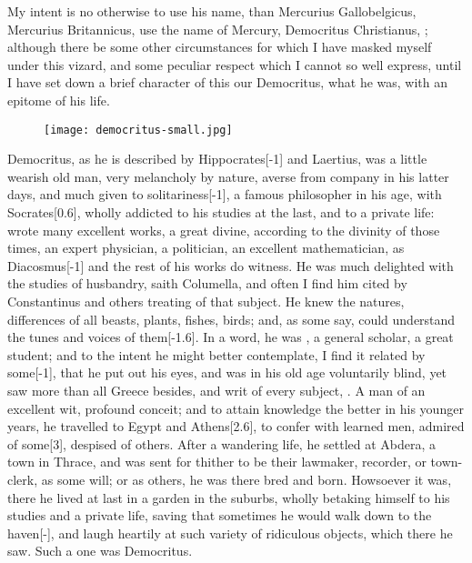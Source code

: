 {My intent is no otherwise to use his name, than Mercurius
Gallobelgicus, Mercurius Britannicus, use the name of Mercury,
Democritus Christianus, \etc; although there be some other
circumstances for which I have masked myself under this vizard, and
some peculiar respect which I cannot so well express, until I have set
down a brief character of this our Democritus, what he was, with an
epitome of his life.
\begin{figure}[H]
  \begingroup
  \centering
  \texttt{[image: democritus-small.jpg]}
  \label{fig:democritus}
\end{figure}
Democritus, as he is described by Hippocrates[-1\baselineskip] and Laertius, was
a little wearish old man, very melancholy by nature, averse from
company in his latter days, and much given to solitariness[-1\baselineskip], a
famous philosopher in his age,  with Socrates[0.6\baselineskip], wholly
addicted to his studies at the last, and to a private life: wrote many
excellent works, a great divine, according to the divinity of those
times, an expert physician, a politician, an excellent mathematician,
as Diacosmus[-1\baselineskip] and the rest of his works do witness. He was much
delighted with the studies of husbandry, saith Columella, and often
I find him cited by Constantinus and others treating of that
subject. He knew the natures, differences of all beasts, plants,
fishes, birds; and, as some say, could understand the tunes and
voices of them[-1.6\baselineskip]. In a word, he was , a general scholar,
a great student; and to the intent he might better contemplate, I
find it related by some[-1\baselineskip], that he put out his eyes, and was in his old
age voluntarily blind, yet saw more than all Greece besides, and 
writ of every subject, . A man of an excellent wit, profound conceit; and to
attain knowledge the better in his younger years, he travelled to Egypt
and Athens[2.6\baselineskip], to confer with learned men, admired of some[3\baselineskip],
despised of others. After a wandering life, he settled at Abdera, a
town in Thrace, and was sent for thither to be their lawmaker,
recorder, or town-clerk, as some will; or as others, he was there bred
and born. Howsoever it was, there he lived at last in a garden in the
suburbs, wholly betaking himself to his studies and a private life,
saving that sometimes he would walk down to the haven[-\baselineskip], and
laugh heartily at such variety of ridiculous objects, which there he
saw. Such a one was Democritus.

}
